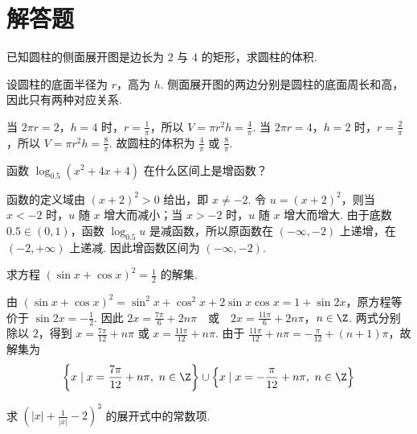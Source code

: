 \section{解答题}

\begin{problem}

已知圆柱的侧面展开图是边长为 \(2\) 与 \(4\) 的矩形，求圆柱的体积.
\end{problem}

\begin{solution}
设圆柱的底面半径为 \(r\)，高为 \(h\). 侧面展开图的两边分别是圆柱的底面周长和高，因此只有两种对应关系.

当 \(2\pi r=2\)，\(h=4\) 时，\(r=\frac{1}{\pi}\)，所以 \(V=\pi r^2h=\frac{4}{\pi}\). 当 \(2\pi r=4\)，\(h=2\) 时，\(r=\frac{2}{\pi}\)，所以 \(V=\pi r^2h=\frac{8}{\pi}\). 故圆柱的体积为 \(\frac{4}{\pi}\) 或 \(\frac{8}{\pi}\).
\end{solution}

\begin{problem}

函数 \(\log_{0.5}(x^2 + 4x + 4)\) 在什么区间上是增函数？
\end{problem}

\begin{solution}
函数的定义域由 \((x+2)^2>0\) 给出，即 \(x\neq-2\). 令 \(u=(x+2)^2\)，则当 \(x<-2\) 时，\(u\) 随 \(x\) 增大而减小；当 \(x>-2\) 时，\(u\) 随 \(x\) 增大而增大. 由于底数 \(0.5\in(0,1)\)，函数 \(\log_{0.5}u\) 是减函数，所以原函数在 \((-\infty,-2)\) 上递增，在 \((-2,+\infty)\) 上递减. 因此增函数区间为 \((-\infty,-2)\).
\end{solution}

\begin{problem}

求方程 \((\sin x + \cos x)^{2} = \frac{1}{2} \) 的解集.
\end{problem}

\begin{solution}
由 \((\sin x+\cos x)^2=\sin^2x+\cos^2x+2\sin x\cos x=1+\sin2x\)，原方程等价于 \(\sin2x=-\frac12\). 因此
\(2x=\frac{7\pi}{6}+2n\pi\quad\text{或}\quad 2x=\frac{11\pi}{6}+2n\pi\)，\(n\in\Z\).
两式分别除以 \(2\)，得到 \(x=\frac{7\pi}{12}+n\pi\) 或 \(x=\frac{11\pi}{12}+n\pi\). 由于 \(\frac{11\pi}{12}+n\pi=-\frac{\pi}{12}+(n+1)\pi\)，故解集为
\[
\left\{x\mid x=\frac{7\pi}{12}+n\pi,\ n\in\Z\right\}\cup\left\{x\mid x=-\frac{\pi}{12}+n\pi,\ n\in\Z\right\}
\]
\end{solution}

\begin{problem}

求 \(\left(|x| + \frac{1}{|x|} - 2\right)^3\) 的展开式中的常数项.
\end{problem}

